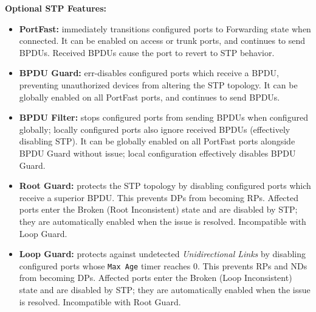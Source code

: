 \documentclass[12pt]{article}
\begin{document}
	\noindent\textbf{Optional STP Features:}
	\begin{itemize}
		\label{itm:STP FEATURES}
		\item{\textbf{PortFast:} immediately transitions configured ports to Forwarding state when connected. It can be enabled on access or trunk ports, and continues to send BPDUs. Received BPDUs cause the port to revert to STP behavior.}
		\item{\textbf{BPDU Guard:} err-disables configured ports which receive a BPDU, preventing unauthorized devices from altering the STP topology. It can be globally enabled on all PortFast ports, and continues to send BPDUs.}
		\item{\textbf{BPDU Filter:} stops configured ports from sending BPDUs when configured globally; locally configured ports also ignore received BPDUs (effectively disabling STP). It can be globally enabled on all PortFast ports alongside BPDU Guard without issue; local configuration effectively disables BPDU Guard.}
		\item{\textbf{Root Guard:} protects the STP topology by disabling configured ports which receive a superior BPDU. This prevents DPs from becoming RPs. Affected ports enter the Broken (Root Inconsistent) state and are disabled by STP; they are automatically enabled when the issue is resolved. Incompatible with Loop Guard.}
		\item{\textbf{Loop Guard:} protects against undetected \textit{Unidirectional Links} by disabling configured ports whose \texttt{Max Age} timer reaches 0. This prevents RPs and NDs from becoming DPs. Affected ports enter the Broken (Loop Inconsistent) state and are disabled by STP; they are automatically enabled when the issue is resolved. Incompatible with Root Guard.}
	\end{itemize}


\end{document}
